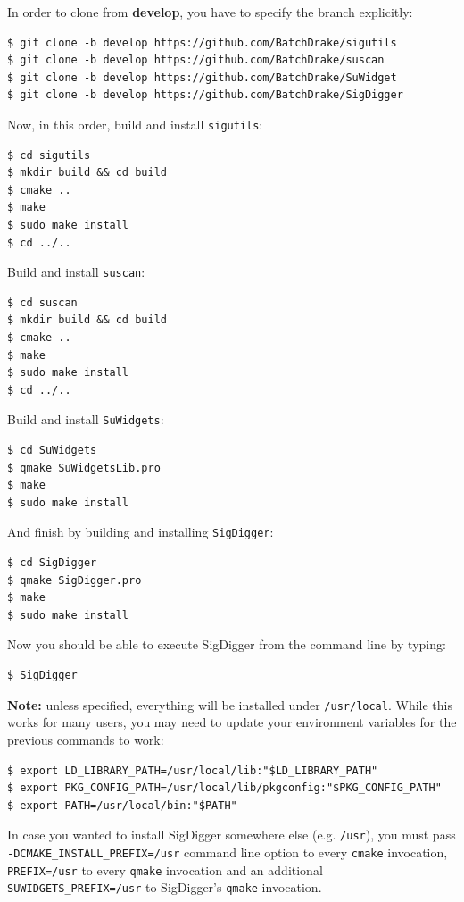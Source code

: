 \documentclass{ol-softwaremanual}
\begin{document}
In order to clone from \textbf{develop}, you have to specify the branch explicitly:

\begin{lstlisting}
$ git clone -b develop https://github.com/BatchDrake/sigutils
$ git clone -b develop https://github.com/BatchDrake/suscan
$ git clone -b develop https://github.com/BatchDrake/SuWidget
$ git clone -b develop https://github.com/BatchDrake/SigDigger
\end{lstlisting}

Now, in this order, build and install \texttt{sigutils}:

\begin{lstlisting}
$ cd sigutils
$ mkdir build && cd build
$ cmake ..
$ make
$ sudo make install
$ cd ../..
\end{lstlisting}

Build and install \texttt{suscan}:

\begin{lstlisting}
$ cd suscan
$ mkdir build && cd build
$ cmake ..
$ make
$ sudo make install
$ cd ../..
\end{lstlisting}

Build and install \texttt{SuWidgets}:

\begin{lstlisting}
$ cd SuWidgets
$ qmake SuWidgetsLib.pro
$ make
$ sudo make install
\end{lstlisting}

And finish by building and installing \texttt{SigDigger}:

\begin{lstlisting}
$ cd SigDigger
$ qmake SigDigger.pro
$ make
$ sudo make install
\end{lstlisting}

Now you should be able to execute SigDigger from the command line by typing:

\begin{lstlisting}
$ SigDigger
\end{lstlisting}

\begin{protip}
\textbf{Note:} unless specified, everything will be installed under \texttt{/usr/local}. While this works for many users, you may need to update your environment variables for the previous commands to work:

\begin{lstlisting}
$ export LD_LIBRARY_PATH=/usr/local/lib:"$LD_LIBRARY_PATH"
$ export PKG_CONFIG_PATH=/usr/local/lib/pkgconfig:"$PKG_CONFIG_PATH"
$ export PATH=/usr/local/bin:"$PATH"
\end{lstlisting}

In case you wanted to install SigDigger somewhere else (e.g. \texttt{/usr}), you must pass \texttt{-DCMAKE\_INSTALL\_PREFIX=/usr} command line option to every \texttt{cmake} invocation, \texttt{PREFIX=/usr} to every \texttt{qmake} invocation and an additional \texttt{SUWIDGETS\_PREFIX=/usr} to SigDigger's \texttt{qmake} invocation.
\end{protip}
\end{document}

